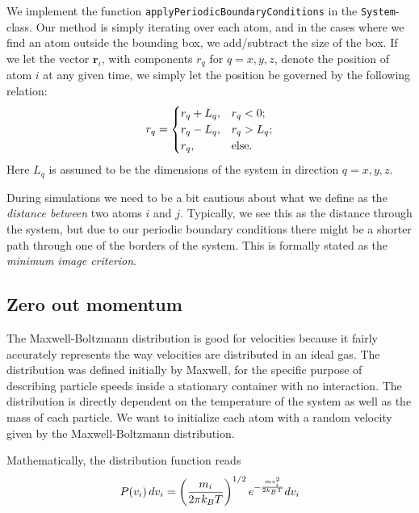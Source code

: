 \documentclass[a4paper]{article}
\renewcommand{\vec}[1]{\mathbf{#1}}
\begin{document}
    We implement the function \texttt{applyPeriodicBoundaryConditions} in the
    \texttt{System}-class.  Our method is simply iterating over each atom, and
    in the cases where we find an atom outside the bounding box, we
    add/subtract the size of the box. If we let the vector $\vec{r}_i$, with
    components $r_q$ for $q = x, y, z$, denote the position of atom $i$ at any
    given time, we simply let the position be governed by the following
    relation:
    \begin{equation}
        \notag
        r_q = \begin{cases}
            r_q + L_q, & r_q < 0; \\
            r_q - L_q, & r_q > L_q; \\
            r_q, & \text{else.}
        \end{cases}
    \end{equation}
    Here $L_q$ is assumed to be the dimensions of the system in direction $q =
    x, y, z$.
    
    During simulations we need to be a bit cautious about what we define as the
    \emph{distance between} two atoms $i$ and $j$. Typically, we see this as
    the distance through the system, but due to our periodic boundary
    conditions there might be a shorter path through one of the borders of the
    system. This is formally stated as the \emph{minimum image
    criterion}\cite{min_image}.
    
\subsection{Zero out momentum}
\label{sub:zero_out_momentum}

    The Maxwell-Boltzmann distribution is good for velocities because it fairly
    accurately represents the way velocities are distributed in an ideal gas.
    The distribution was defined initially by Maxwell, for the specific purpose
    of describing particle speeds inside a stationary container with no
    interaction.  The distribution is directly dependent on the temperature of
    the system as well as the mass of each particle. We want to initialize each
    atom with a random velocity given by the Maxwell-Boltzmann distribution.

    Mathematically, the distribution function reads
    \begin{equation}
        \notag
        P(v_i)\, dv_i = \left( \frac{m_i}{2\pi k_BT} \right)^{1/2} e^{-\frac{mv_i^2}{2k_BT}}dv_i
    \end{equation}
\end{document}
